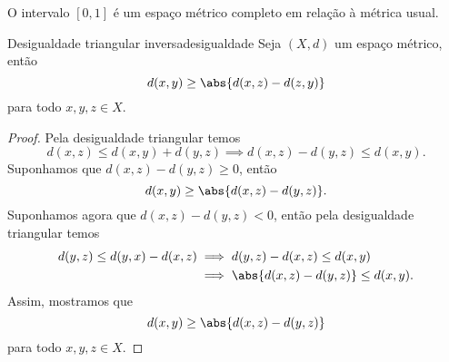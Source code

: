 \begin{corollary}
    O intervalo \([0,1]\) é um espaço métrico completo em relação à métrica usual.
\end{corollary}

\begin{lemma}{Desigualdade triangular inversa}{desigualdade}
    Seja \((X,d)\) um espaço métrico, então
    \begin{equation*}
        d(x,y) \geq \abs{d(x,z) - d(z,y)}
    \end{equation*}
    para todo \(x,y,z \in X\).
\end{lemma}
\begin{proof}
    Pela desigualdade triangular temos
    \begin{equation*}
        d(x,z) \leq d(x,y) + d(y,z) \implies d(x,z) - d(y,z) \leq d(x,y).
    \end{equation*}
    Suponhamos que \(d(x,z) - d(y,z) \geq 0\), então
    \begin{equation*}
        d(x,y) \geq \abs{d(x,z) - d(y,z)}.
    \end{equation*}
    Suponhamos agora que \(d(x,z) - d(y,z) < 0\), então pela desigualdade triangular temos
    \begin{align*}
        d(y,z) \leq d(y,x) - d(x,z) &\implies d(y,z) - d(x,z) \leq d(x,y)\\
                                    &\implies \abs{d(x,z) - d(y,z)} \leq d(x,y).
    \end{align*}
    Assim, mostramos que
    \begin{equation*}
        d(x,y) \geq \abs{d(x,z) - d(y,z)}
    \end{equation*}
    para todo \(x,y,z \in X\).
\end{proof}

